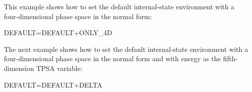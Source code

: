 This example shows how to set the default internal-state environment with a
four-dimensional phase space in the normal form:

\begin{ptccode}
DEFAULT=DEFAULT+ONLY_4D\\
\end{ptccode}

The next example shows how to set the default internal-state environment with a
four-dimensional phase space in the normal form and with energy as the fifth-dimension
TPSA variable:

\begin{ptccode}
DEFAULT=DEFAULT+DELTA\\
\end{ptccode}

\endinput
